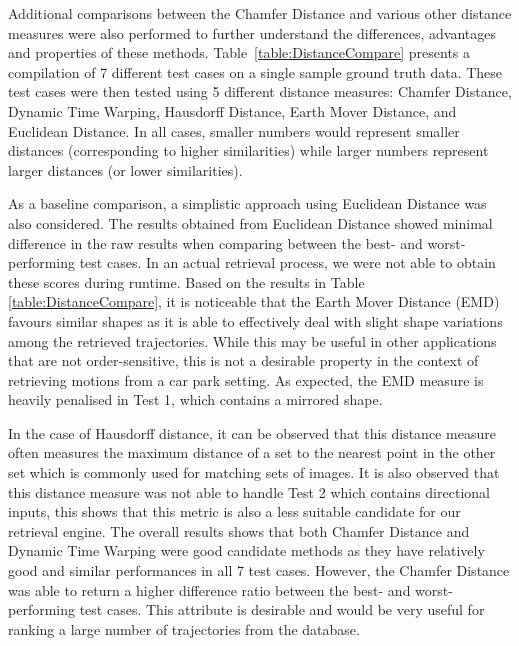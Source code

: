 Additional comparisons between the Chamfer Distance and various other distance measures were also performed to further understand the differences, advantages and properties of these methods. Table~\ref{table:DistanceCompare} presents a compilation of 7 different test cases on a single sample ground truth data. These test cases were then tested using 5 different distance measures: Chamfer Distance, Dynamic Time Warping, Hausdorff Distance, Earth Mover Distance, and Euclidean Distance. In all cases, smaller numbers would represent smaller distances (corresponding to higher similarities) while larger numbers represent larger distances (or lower similarities).

As a baseline comparison, a simplistic approach using Euclidean Distance was also considered. The results obtained from Euclidean Distance showed minimal difference in the raw results when comparing between the best- and worst-performing test cases. %
In an actual retrieval process, we were not able to obtain these scores during runtime. Based on the results in Table \ref{table:DistanceCompare}, it is noticeable that the Earth Mover Distance (EMD) favours similar shapes as it is able to effectively deal with slight shape variations among the retrieved trajectories. While this may be useful in other applications that are not order-sensitive, this is not a desirable property in the context of retrieving motions from a car park setting. As expected, the EMD measure is heavily penalised in Test 1, which contains a mirrored shape.

In the case of Hausdorff distance, it can be observed that this distance measure often measures the maximum distance of a set to the nearest point in the other set which is commonly used for matching sets of images. It is also observed that this distance measure was not able to handle Test 2 which contains directional inputs, this shows that this metric is also a less suitable candidate for our retrieval engine. The overall results shows that both Chamfer Distance and Dynamic Time Warping were good candidate methods as they have relatively good and similar performances in all 7 test cases. However, the Chamfer Distance was able to return a higher difference ratio between the best- and worst-performing test cases. This attribute is desirable and would be very useful for ranking a large number of trajectories from the database.

